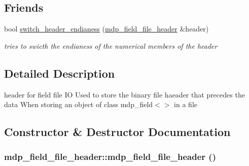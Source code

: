 \subsection*{Friends}
\begin{DoxyCompactItemize}
\item 
bool \hyperlink{classmdp__field__file__header_ab3818e6c0a7da0722f0157d14ef19e06}{switch\_\-header\_\-endianess} (\hyperlink{classmdp__field__file__header}{mdp\_\-field\_\-file\_\-header} \&header)
\begin{DoxyCompactList}\small\item\em tries to swicth the endianess of the numerical members of the header \item\end{DoxyCompactList}\end{DoxyCompactItemize}


\subsection{Detailed Description}
header for field file IO Used to store the binary file haeader that precedes the data When storing an object of class mdp\_\-field$<$$>$ in a file 

\subsection{Constructor \& Destructor Documentation}
\hypertarget{classmdp__field__file__header_ab097916f6edf2141bf8219384c5c2d95}{
\subsubsection[{mdp\_\-field\_\-file\_\-header}]{\setlength{\rightskip}{0pt plus 5cm}mdp\_\-field\_\-file\_\-header::mdp\_\-field\_\-file\_\-header ()}}
\label{classmdp__field__file__header_ab097916f6edf2141bf8219384c5c2d95}


